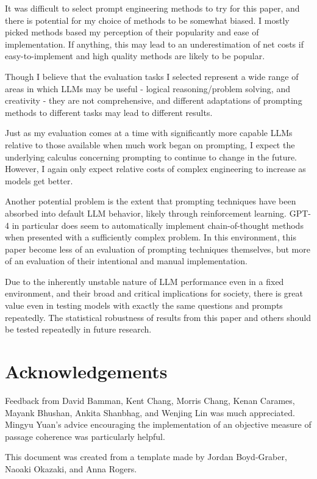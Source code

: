 \documentclass[11pt]{article}
\begin{document}
It was difficult to select prompt engineering methods to try for this paper, and there is potential for my choice of methods to be somewhat biased. I mostly picked methods based my perception of their popularity and ease of implementation. If anything, this may lead to an underestimation of net costs if easy-to-implement and high quality methods are likely to be popular. 

Though I believe that the evaluation tasks I selected represent a wide range of areas in which LLMs may be useful - logical reasoning/problem solving, and creativity - they are not comprehensive, and different adaptations of prompting methods to different tasks may lead to different results.

Just as my evaluation comes at a time with significantly more capable LLMs relative to those available when much work began on prompting, I expect the underlying calculus concerning prompting to continue to change in the future. However, I again only expect relative costs of complex engineering to increase as models get better.

Another potential problem is the extent that prompting techniques have been absorbed into default LLM behavior, likely through reinforcement learning. GPT-4 in particular does seem to automatically implement chain-of-thought methods when presented with a sufficiently complex problem. In this environment, this paper become less of an evaluation of prompting techniques themselves, but more of an evaluation of their intentional and manual implementation.

Due to the inherently unstable nature of LLM performance even in a fixed environment, and their broad and critical implications for society, there is great value even in testing models with exactly the same questions and prompts repeatedly. The statistical robustness of results from this paper and others should be tested repeatedly in future research.

\section*{Acknowledgements}

Feedback from David Bamman, Kent Chang, Morris Chang, Kenan Carames, Mayank Bhushan, Ankita Shanbhag, and Wenjing Lin was much appreciated. Mingyu Yuan's advice encouraging the implementation of an objective measure of passage coherence was particularly helpful.

This document was created from a template made by Jordan Boyd-Graber, Naoaki Okazaki, and Anna Rogers.
\end{document}
